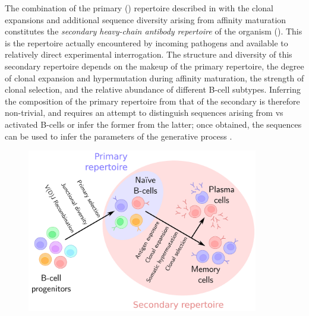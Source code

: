 The combination of the primary (\naive) repertoire described in  with the clonal expansions and additional sequence diversity arising from affinity maturation constitutes the \textit{secondary heavy-chain antibody repertoire} of the organism (). This is the repertoire actually encountered by incoming pathogens and available to relatively direct experimental interrogation. The structure and diversity of this secondary repertoire depends on the makeup of the primary repertoire, the degree of clonal expansion and hypermutation during affinity maturation, the strength of clonal selection, and the relative abundance of different B-cell subtypes. Inferring the composition of the primary repertoire from that of the secondary is therefore non-trivial, and requires an attempt to distinguish sequences arising from \naive vs activated B-cells or infer the former from the latter; once obtained, the \naive sequences can be used to infer the parameters of the generative process \parencite{elhanati2015model,marcou2018igor}.

\begin{figure}
\centering
\includegraphics[width=0.9\textwidth]{_Figures/png_edited/bcell-repertoire-primary-secondary}
\label{fig:intro-bcell-repertoires}
\end{figure}

